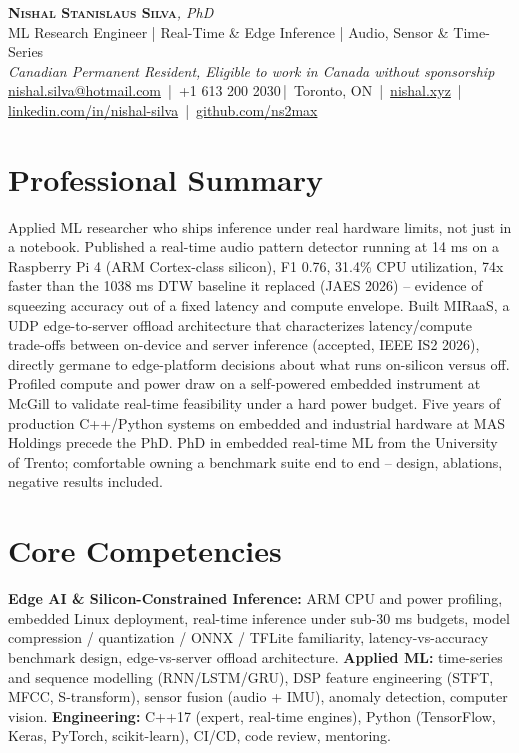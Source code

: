 \documentclass[11pt]{article}
\makeatletter
\newcommand{\cvName}{Nishal Stanislaus Silva}
\newcommand{\cvEmail}{nishal.silva@hotmail.com}
\newcommand{\cvPhone}{+1 613 200 2030}
\newcommand{\cvCity}{Toronto, ON}
\newcommand{\cvSite}{https://nishal.xyz}
\newcommand{\cvLinkedIn}{https://www.linkedin.com/in/nishal-silva}
\newcommand{\cvGitHub}{https://github.com/ns2max}
\newcommand{\cvStatus}{Canadian Permanent Resident, Eligible to work in Canada without sponsorship}
\newcommand{\cvTagline}{ML Research Engineer | Real-Time \& Edge Inference | Audio, Sensor \& Time-Series}
\makeatother
\begin{document}
\pagestyle{empty}
\begin{center}
    {\LARGE \scshape \textbf{\cvName}}{\large \textit{, PhD}}\\[1pt]
    {\small \cvTagline}\\[1pt]
    {\footnotesize\textit{\cvStatus}}\\[1pt]
    {\small
    \href{mailto:\cvEmail}{\cvEmail} \,|\, \cvPhone \,|\, \cvCity
    \,|\, \href{\cvSite}{nishal.xyz} \,|\, \href{\cvLinkedIn}{linkedin.com/in/nishal-silva}
    \,|\, \href{\cvGitHub}{github.com/ns2max}}
\end{center}

\section*{Professional Summary}
Applied ML researcher who ships inference under real hardware limits, not just in a notebook. Published a real-time audio pattern detector running at 14 ms on a Raspberry Pi 4 (ARM Cortex-class silicon), F1 0.76, 31.4\% CPU utilization, 74x faster than the 1038 ms DTW baseline it replaced (JAES 2026) -- evidence of squeezing accuracy out of a fixed latency and compute envelope. Built MIRaaS, a UDP edge-to-server offload architecture that characterizes latency/compute trade-offs between on-device and server inference (accepted, IEEE IS2 2026), directly germane to edge-platform decisions about what runs on-silicon versus off. Profiled compute and power draw on a self-powered embedded instrument at McGill to validate real-time feasibility under a hard power budget. Five years of production C++/Python systems on embedded and industrial hardware at MAS Holdings precede the PhD. PhD in embedded real-time ML from the University of Trento; comfortable owning a benchmark suite end to end -- design, ablations, negative results included.

\section*{Core Competencies}
\textbf{Edge AI \& Silicon-Constrained Inference:} ARM CPU and power profiling, embedded Linux deployment, real-time inference under sub-30 ms budgets, model compression / quantization / ONNX / TFLite familiarity, latency-vs-accuracy benchmark design, edge-vs-server offload architecture. \textbf{Applied ML:} time-series and sequence modelling (RNN/LSTM/GRU), DSP feature engineering (STFT, MFCC, S-transform), sensor fusion (audio + IMU), anomaly detection, computer vision. \textbf{Engineering:} C++17 (expert, real-time engines), Python (TensorFlow, Keras, PyTorch, scikit-learn), CI/CD, code review, mentoring.
\end{document}
